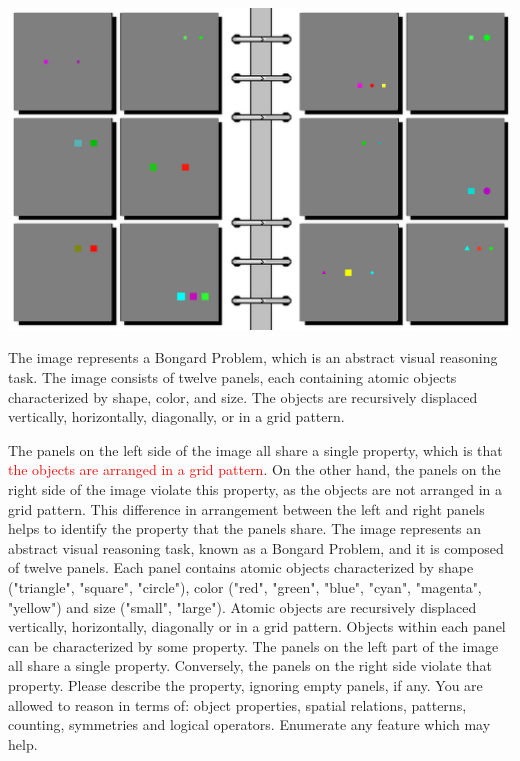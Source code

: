 \begin{tcolorbox}[breakable,enhanced jigsaw,opacityback=0,]
	\centering
	\includegraphics[width=.8\linewidth]{imgs/bongard/easy-18.png}\\
	\begin{dialogue}
		 The image represents a Bongard Problem, which is an abstract visual reasoning task. The image consists of twelve panels, each containing atomic objects characterized by shape, color, and size. The objects are recursively displaced vertically, horizontally, diagonally, or in a grid pattern.
		
		The panels on the left side of the image all share a single property, which is that \textcolor{red}{the objects are arranged in a grid pattern}. On the other hand, the panels on the right side of the image violate this property, as the objects are not arranged in a grid pattern. This difference in arrangement between the left and right panels helps to identify the property that the panels share.
		\vspace{1em}
		 The image represents an abstract visual reasoning task, known as a Bongard Problem, and it is composed of twelve panels. Each panel contains atomic objects characterized by shape ("triangle", "square", "circle"), color ("red", "green", "blue", "cyan", "magenta", "yellow") and size ("small", "large"). Atomic objects are recursively displaced vertically, horizontally, diagonally or in a grid pattern. Objects within each panel can be characterized by some property. The panels on the left part of the image all share a single property. Conversely, the panels on the right side violate that property. Please describe the property, ignoring empty panels, if any. You are allowed to reason in terms of: object properties, spatial relations, patterns, counting, symmetries and logical operators. Enumerate any feature which may help.
		

\end{dialogue}
\end{tcolorbox}

